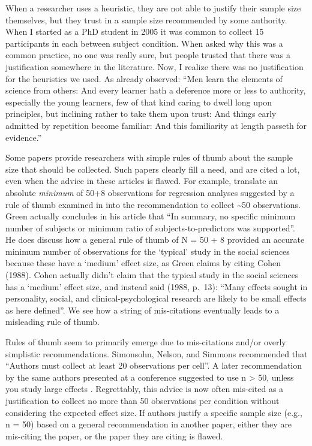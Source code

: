\documentclass[
  oneside]{krantz}
\begin{document}
When a researcher uses a heuristic, they are not able to justify their sample size themselves, but they trust in a sample size recommended by some authority. When I started as a PhD student in 2005 it was common to collect 15 participants in each between subject condition. When asked why this was a common practice, no one was really sure, but people trusted that there was a justification somewhere in the literature. Now, I realize there was no justification for the heuristics we used. As \citet{berkeley_defence_1735} already observed: ``Men learn the elements of science from others: And every learner hath a deference more or less to authority, especially the young learners, few of that kind caring to dwell long upon principles, but inclining rather to take them upon trust: And things early admitted by repetition become familiar: And this familiarity at length passeth for evidence.''

Some papers provide researchers with simple rules of thumb about the sample size that should be collected. Such papers clearly fill a need, and are cited a lot, even when the advice in these articles is flawed. For example, \citet{wilson_vanvoorhis_understanding_2007} translate an absolute \emph{minimum} of 50+8 observations for regression analyses suggested by a rule of thumb examined in \citet{green_how_1991} into the recommendation to collect \textasciitilde50 observations. Green actually concludes in his article that ``In summary, no specific minimum number of subjects or minimum ratio of subjects-to-predictors was supported''. He does discuss how a general rule of thumb of N = 50 + 8 provided an accurate minimum number of observations for the `typical' study in the social sciences because these have a `medium' effect size, as Green claims by citing Cohen (1988). Cohen actually didn't claim that the typical study in the social sciences has a `medium' effect size, and instead said (1988, p.~13): ``Many effects sought in personality, social, and clinical-psychological research are likely to be small effects as here defined''. We see how a string of mis-citations eventually leads to a misleading rule of thumb.

Rules of thumb seem to primarily emerge due to mis-citations and/or overly simplistic recommendations. Simonsohn, Nelson, and Simmons \citeyearpar{simmons_false-positive_2011} recommended that ``Authors must collect at least 20 observations per cell''. A later recommendation by the same authors presented at a conference suggested to use n \textgreater{} 50, unless you study large effects \citep{simmons_life_2013}. Regrettably, this advice is now often mis-cited as a justification to collect no more than 50 observations per condition without considering the expected effect size. If authors justify a specific sample size (e.g., n = 50) based on a general recommendation in another paper, either they are mis-citing the paper, or the paper they are citing is flawed.
\end{document}
